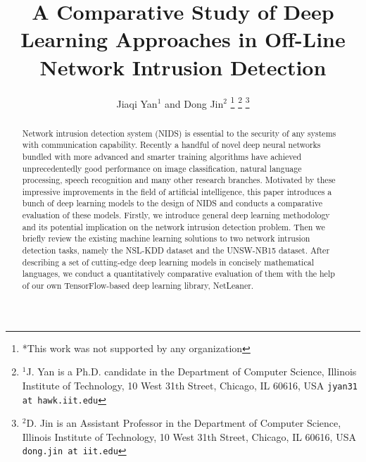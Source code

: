 \documentclass[letterpaper, 10 pt, conference]{ieeeconf}  %
\title{\LARGE \bf
A Comparative Study of Deep Learning Approaches in Off-Line Network Intrusion Detection
}
\author{Jiaqi Yan$^{1}$ and Dong Jin$^{2}$%
\thanks{*This work was not supported by any organization}%
\thanks{$^{1}$J. Yan is a Ph.D. candidate in the Department of Computer Science,
        Illinois Institute of Technology, 10 West 31th Street, Chicago, IL 60616, USA
        {\tt\small jyan31 at hawk.iit.edu}}%
\thanks{$^{2}$D. Jin is an Assistant Professor in the Department of Computer Science,
		Illinois Institute of Technology,
        10 West 31th Street, Chicago, IL 60616, USA
        {\tt\small dong.jin at iit.edu}}%
}
\begin{document}
\maketitle
\thispagestyle{empty}
\pagestyle{empty}


\begin{abstract}
Network intrusion detection system (NIDS) is essential to the security of any systems with communication capability.
Recently a handful of novel deep neural networks bundled with more advanced and smarter
training algorithms have achieved unprecedentedly good performance on image classification,
natural language processing, speech recognition and many other research branches.
Motivated by these impressive improvements in the field of artificial intelligence,
this paper introduces a bunch of deep learning models to the design of NIDS
and conducts a comparative evaluation of these models.
Firstly, we introduce general deep learning methodology and its potential implication on the
network intrusion detection problem.
Then we briefly review the existing machine learning solutions to two network intrusion detection tasks, namely the NSL-KDD dataset and the UNSW-NB15 dataset.
After describing a set of cutting-edge deep learning models in concisely mathematical languages,
we conduct a quantitatively comparative evaluation of them with the help of
our own TensorFlow-based deep learning library, NetLeaner.
\end{abstract}












\end{document}
